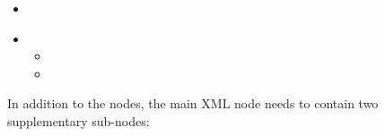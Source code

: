 %
\attrIntro

\begin{itemize}
  \itemsep0em
  \item \nameDescription
\end{itemize}


\begin{itemize}
  \item \variableDescription
    \variableChildrenIntro
    \begin{itemize}
      \item \distributionDescription
    \item \functionDescription
    \end{itemize}
\end{itemize}

In addition to the  nodes, the main XML node
 needs to contain two supplementary sub-nodes:

